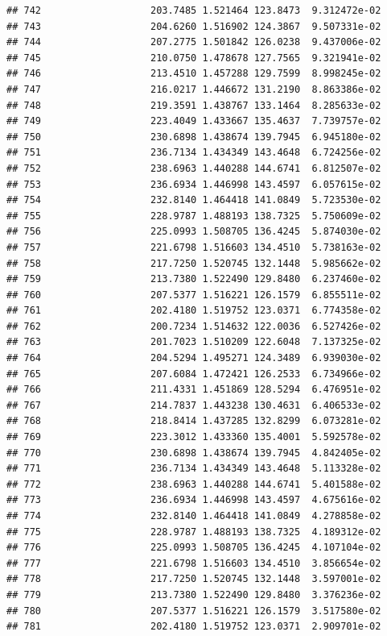 \documentclass[
]{article}
\begin{document}
\begin{verbatim}
## 742                   203.7485 1.521464 123.8473  9.312472e-02
## 743                   204.6260 1.516902 124.3867  9.507331e-02
## 744                   207.2775 1.501842 126.0238  9.437006e-02
## 745                   210.0750 1.478678 127.7565  9.321941e-02
## 746                   213.4510 1.457288 129.7599  8.998245e-02
## 747                   216.0217 1.446672 131.2190  8.863386e-02
## 748                   219.3591 1.438767 133.1464  8.285633e-02
## 749                   223.4049 1.433667 135.4637  7.739757e-02
## 750                   230.6898 1.438674 139.7945  6.945180e-02
## 751                   236.7134 1.434349 143.4648  6.724256e-02
## 752                   238.6963 1.440288 144.6741  6.812507e-02
## 753                   236.6934 1.446998 143.4597  6.057615e-02
## 754                   232.8140 1.464418 141.0849  5.723530e-02
## 755                   228.9787 1.488193 138.7325  5.750609e-02
## 756                   225.0993 1.508705 136.4245  5.874030e-02
## 757                   221.6798 1.516603 134.4510  5.738163e-02
## 758                   217.7250 1.520745 132.1448  5.985662e-02
## 759                   213.7380 1.522490 129.8480  6.237460e-02
## 760                   207.5377 1.516221 126.1579  6.855511e-02
## 761                   202.4180 1.519752 123.0371  6.774358e-02
## 762                   200.7234 1.514632 122.0036  6.527426e-02
## 763                   201.7023 1.510209 122.6048  7.137325e-02
## 764                   204.5294 1.495271 124.3489  6.939030e-02
## 765                   207.6084 1.472421 126.2533  6.734966e-02
## 766                   211.4331 1.451869 128.5294  6.476951e-02
## 767                   214.7837 1.443238 130.4631  6.406533e-02
## 768                   218.8414 1.437285 132.8299  6.073281e-02
## 769                   223.3012 1.433360 135.4001  5.592578e-02
## 770                   230.6898 1.438674 139.7945  4.842405e-02
## 771                   236.7134 1.434349 143.4648  5.113328e-02
## 772                   238.6963 1.440288 144.6741  5.401588e-02
## 773                   236.6934 1.446998 143.4597  4.675616e-02
## 774                   232.8140 1.464418 141.0849  4.278858e-02
## 775                   228.9787 1.488193 138.7325  4.189312e-02
## 776                   225.0993 1.508705 136.4245  4.107104e-02
## 777                   221.6798 1.516603 134.4510  3.856654e-02
## 778                   217.7250 1.520745 132.1448  3.597001e-02
## 779                   213.7380 1.522490 129.8480  3.376236e-02
## 780                   207.5377 1.516221 126.1579  3.517580e-02
## 781                   202.4180 1.519752 123.0371  2.909701e-02

\end{verbatim}
\end{document}
